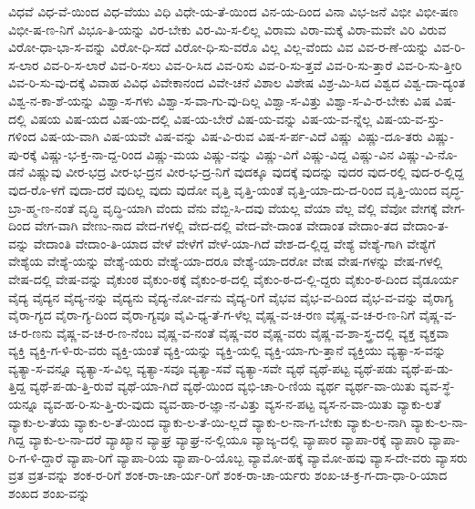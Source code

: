 {ವಿಧವೆ
ವಿಧ-ವೆ-ಯಿಂದ
ವಿಧ-ವೆಯು
ವಿಧಿ
ವಿಧೇ-ಯ-ತೆ-ಯಿಂದ
ವಿನ-ಯ-ದಿಂದ
ವಿನಾ
ವಿಭ-ಜನೆ
ವಿಭೀ
ವಿಭೀ-ಷಣ
ವಿಭೀ-ಷ-ಣ-ನಿಗೆ
ವಿಭೂ-ತಿ-ಯನ್ನು
ವಿರ-ಬೇಕು
ವಿರ-ಮಿ-ಸ-ಲಿಲ್ಲ
ವಿರಾಮ
ವಿರಾ-ಮಕ್ಕೆ
ವಿರಾ-ಮವೇ
ವಿರಿ
ವಿರುವ
ವಿರೋ-ಧಾ-ಭಾ-ಸ-ವನ್ನು
ವಿರೋ-ಧಿ-ಸದೆ
ವಿರೋ-ಧಿ-ಸು-ವರೊ
ವಿಲ್ಲ
ವಿಲ್ಲ-ವೆಂದು
ವಿವ
ವಿವ-ರ-ಣೆ-ಯನ್ನು
ವಿವ-ರಿ-ಸ-ಲಾರ
ವಿವ-ರಿ-ಸ-ಲಾರೆ
ವಿವ-ರಿ-ಸಲು
ವಿವ-ರಿ-ಸಿದ
ವಿವ-ರಿಸು
ವಿವ-ರಿ-ಸು-ತ್ತವೆ
ವಿವ-ರಿ-ಸು-ತ್ತಾರೆ
ವಿವ-ರಿ-ಸು-ತ್ತೀರಿ
ವಿವ-ರಿ-ಸು-ವು-ದಕ್ಕೆ
ವಿವಾಹ
ವಿವಿಧ
ವಿವೇಕಾನಂದ
ವಿವೇ-ಚನೆ
ವಿಶಾಲ
ವಿಶೇಷ
ವಿಶ್ರ-ಮಿ-ಸಿದ
ವಿಶ್ವದ
ವಿಶ್ವ-ದಾ-ದ್ಯಂತ
ವಿಶ್ವ-ನ-ಕಾ-ಶೆ-ಯನ್ನು
ವಿಶ್ವಾ-ಸ-ಗಳು
ವಿಶ್ವಾ-ಸ-ವಾ-ಗು-ವು-ದಿಲ್ಲ
ವಿಶ್ವಾ-ಸ-ವಿತ್ತು
ವಿಶ್ವಾ-ಸ-ವಿ-ರ-ಬೇಕು
ವಿಷ
ವಿಷ-ದಲ್ಲಿ
ವಿಷಯ
ವಿಷ-ಯದ
ವಿಷ-ಯ-ದಲ್ಲಿ
ವಿಷ-ಯ-ಬೇರೆ
ವಿಷ-ಯ-ವನ್ನು
ವಿಷ-ಯ-ವ-ನ್ನೆಲ್ಲ
ವಿಷ-ಯ-ವ-ಸ್ತು-ಗಳಿಂದ
ವಿಷ-ಯ-ವಾಗಿ
ವಿಷ-ಯವೇ
ವಿಷ-ವನ್ನು
ವಿಷ-ವಿ-ರುವ
ವಿಷ-ಸ-ರ್ಪ-ವಿದೆ
ವಿಷ್ಣು
ವಿಷ್ಣು-ದೂ-ತರು
ವಿಷ್ಣು-ಪು-ರಕ್ಕೆ
ವಿಷ್ಣು-ಭ-ಕ್ತ-ನಾ-ದ್ದ-ರಿಂದ
ವಿಷ್ಣು-ಮಯ
ವಿಷ್ಣು-ವನ್ನು
ವಿಷ್ಣು-ವಿಗೆ
ವಿಷ್ಣು-ವಿದ್ದ
ವಿಷ್ಣು-ವಿನ
ವಿಷ್ಣು-ವಿ-ನೊ-ಡನೆ
ವಿಷ್ಣುವು
ವೀರ-ಭದ್ರ
ವೀರ-ಭ-ದ್ರನ
ವೀರ-ಭ-ದ್ರ-ನಿಗೆ
ವುದಕ್ಕೂ
ವುದಕ್ಕೆ
ವುದನ್ನು
ವುದರ
ವುದ-ರಲ್ಲಿ
ವುದ-ರ-ಲ್ಲಿದ್ದ
ವುದ-ರೊ-ಳಗೆ
ವುದಾ-ದರೆ
ವುದಿಲ್ಲ
ವುದು
ವುದೋ
ವೃತ್ತಿ
ವೃತ್ತಿ-ಯಂತೆ
ವೃತ್ತಿ-ಯಾ-ದು-ದ-ರಿಂದ
ವೃತ್ತಿ-ಯಿಂದ
ವೃದ್ಧ-ಬ್ರಾ-ಹ್ಮ-ಣ-ನಂತೆ
ವೃದ್ಧಿ
ವೃದ್ಧಿ-ಯಾಗಿ
ವೆಂದು
ವೆನು
ವೆಬ್ಬಿ-ಸಿ-ದವು
ವೆಯಲ್ಲ
ವೆಯಾ
ವೆಲ್ಲ
ವೆಲ್ಲಿ
ವೆವೋ
ವೇಗಕ್ಕೆ
ವೇಗ-ದಿಂದ
ವೇಗ-ವಾಗಿ
ವೇಣು-ನಾದ
ವೇದ-ಗಳಲ್ಲಿ
ವೇದ-ದಲ್ಲಿ
ವೇದ-ವೇ-ದಾಂತ
ವೇದಾಂತ
ವೇದಾಂ-ತದ
ವೇದಾಂ-ತ-ವನ್ನು
ವೇದಾಂತಿ
ವೇದಾಂ-ತಿ-ಯಾದ
ವೇಳೆ
ವೇಳೆಗೆ
ವೇಳೆ-ಯಾ-ಗಿದೆ
ವೇಶ-ದ-ಲ್ಲಿದ್ದ
ವೇಶ್ಯೆ
ವೇಶ್ಯೆ-ಗಾಗಿ
ವೇಶ್ಯೆಗೆ
ವೇಶ್ಯೆಯ
ವೇಶ್ಯೆ-ಯನ್ನು
ವೇಶ್ಯೆ-ಯರು
ವೇಶ್ಯೆ-ಯಾ-ದರೂ
ವೇಶ್ಯೆ-ಯಾ-ದರೋ
ವೇಷ
ವೇಷ-ಗಳನ್ನು
ವೇಷ-ಗಳಲ್ಲಿ
ವೇಷ-ದಲ್ಲಿ
ವೇಷ-ವನ್ನು
ವೈಕುಂಠ
ವೈಕುಂ-ಠಕ್ಕೆ
ವೈಕುಂ-ಠ-ದಲ್ಲಿ
ವೈಕುಂ-ಠ-ದ-ಲ್ಲಿ-ದ್ದರು
ವೈಕುಂ-ಠ-ದಿಂದ
ವೈಡೂರ್ಯ
ವೈದ್ಯ
ವೈದ್ಯನ
ವೈದ್ಯ-ನನ್ನು
ವೈದ್ಯನು
ವೈದ್ಯ-ನೋ-ರ್ವನು
ವೈದ್ಯ-ರಿಗೆ
ವೈಭವ
ವೈಭ-ವ-ದಿಂದ
ವೈಭ-ವ-ವನ್ನು
ವೈರಾಗ್ಯ
ವೈರಾ-ಗ್ಯದ
ವೈರಾ-ಗ್ಯ-ದಿಂದ
ವೈರಾ-ಗ್ಯವೂ
ವೈವಿ-ಧ್ಯ-ತೆ-ಗ-ಳೆಲ್ಲ
ವೈಷ್ಣ-ವ-ಚ-ರಣ
ವೈಷ್ಣ-ವ-ಚ-ರ-ಣ-ನಿಗೆ
ವೈಷ್ಣ-ವ-ಚ-ರ-ಣನು
ವೈಷ್ಣ-ವ-ಚ-ರ-ಣ-ನೆಂಬ
ವೈಷ್ಣ-ವ-ನಂತೆ
ವೈಷ್ಣ-ವರ
ವೈಷ್ಣ-ವರು
ವೈಷ್ಣ-ವ-ಶಾ-ಸ್ತ್ರ-ದಲ್ಲಿ
ವ್ಯಕ್ತ
ವ್ಯಕ್ತವಾ
ವ್ಯಕ್ತಿ
ವ್ಯಕ್ತಿ-ಗ-ಳಿ-ರು-ವರು
ವ್ಯಕ್ತಿ-ಯಂತೆ
ವ್ಯಕ್ತಿ-ಯನ್ನು
ವ್ಯಕ್ತಿ-ಯಲ್ಲಿ
ವ್ಯಕ್ತಿ-ಯಾ-ಗು-ತ್ತಾನೆ
ವ್ಯಕ್ತಿಯು
ವ್ಯತ್ಯಾ-ಸ-ವನ್ನು
ವ್ಯತ್ಯಾ-ಸ-ವನ್ನೂ
ವ್ಯತ್ಯಾ-ಸ-ವಿಲ್ಲ
ವ್ಯತ್ಯಾ-ಸವೂ
ವ್ಯತ್ಯಾ-ಸವೆ
ವ್ಯತ್ಯಾ-ಸವೇ
ವ್ಯಥೆ
ವ್ಯಥೆ-ಪಟ್ಟ
ವ್ಯಥೆ-ಪಡು
ವ್ಯಥೆ-ಪ-ಡು-ತ್ತಿದ್ದ
ವ್ಯಥೆ-ಪ-ಡು-ತ್ತಿ-ರುವೆ
ವ್ಯಥೆ-ಯಾ-ಗಿದೆ
ವ್ಯಥೆ-ಯಿಂದ
ವ್ಯಭಿ-ಚಾ-ರಿ-ಣಿಯ
ವ್ಯರ್ಥ
ವ್ಯರ್ಥ-ವಾ-ಯಿತು
ವ್ಯವ-ಸ್ಥೆ-ಯನ್ನೂ
ವ್ಯವ-ಹ-ರಿ-ಸು-ತ್ತಿ-ರು-ವುದು
ವ್ಯವ-ಹಾ-ರ-ಜ್ಞಾ-ನ-ವಿತ್ತು
ವ್ಯಸ-ನ-ಪಟ್ಟ
ವ್ಯಸ-ನ-ವಾ-ಯಿತು
ವ್ಯಾಕು-ಲತೆ
ವ್ಯಾಕು-ಲ-ತೆಯ
ವ್ಯಾಕು-ಲ-ತೆ-ಯಿಂದ
ವ್ಯಾಕು-ಲ-ತೆ-ಯಿ-ಲ್ಲದೆ
ವ್ಯಾಕು-ಲ-ನಾ-ಗ-ಬೇಕು
ವ್ಯಾಕು-ಲ-ನಾಗಿ
ವ್ಯಾಕು-ಲ-ನಾ-ಗಿದ್ದ
ವ್ಯಾಕು-ಲ-ನಾ-ದರೆ
ವ್ಯಾಖ್ಯಾನ
ವ್ಯಾಘ್ರ
ವ್ಯಾಘ್ರ-ನ-ಲ್ಲಿಯೂ
ವ್ಯಾಜ್ಯ-ದಲ್ಲಿ
ವ್ಯಾಪಾರ
ವ್ಯಾಪಾ-ರಕ್ಕೆ
ವ್ಯಾಪಾರಿ
ವ್ಯಾಪಾ-ರಿ-ಗ-ಳಿ-ದ್ದಾರೆ
ವ್ಯಾಪಾ-ರಿಗೆ
ವ್ಯಾಪಾ-ರಿಯ
ವ್ಯಾಪಾ-ರಿ-ಯೊಬ್ಬ
ವ್ಯಾಮೋ-ಹಕ್ಕೆ
ವ್ಯಾಮೋ-ಹವು
ವ್ಯಾಸ-ದೇ-ವರು
ವ್ಯಾಸರು
ವ್ರತ
ವ್ರತ-ವನ್ನು
ಶಂಕ-ರ-ರಿಗೆ
ಶಂಕ-ರಾ-ಚಾ-ರ್ಯ-ರಿಗೆ
ಶಂಕ-ರಾ-ಚಾ-ರ್ಯರು
ಶಂಖ-ಚ-ಕ್ರ-ಗ-ದಾ-ಧಾ-ರಿ-ಯಾದ
ಶಂಖದ
ಶಂಖ-ವನ್ನು
}
